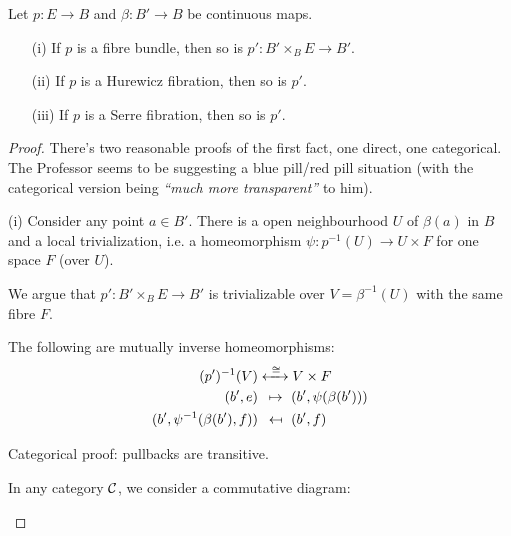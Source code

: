 \begin{theorem}
Let $p:E\to B$ and $\beta:B'\to B$ be continuous maps.
\begin{itemize}
    \item[(i)] If $p$ is a fibre bundle, then so is $p':B'\times_B E\to B'$.
    \item[(ii)] If $p$ is a Hurewicz fibration, then so is $p'$.
    \item[(iii)] If $p$ is a Serre fibration, then so is $p'$.
\end{itemize}
\end{theorem}

\begin{proof}There's two reasonable proofs of the first fact, one direct, one categorical. The Professor seems to be suggesting a blue pill/red pill situation (with the categorical version being \emph{\enquote{much more transparent}} to him).

(i) Consider any point $a\in B'$. There is a open neighbourhood $U$ of $\beta(a)$ in $B$ and a local trivialization, i.e. a homeomorphism $\psi:p^{-1}(U)\to U\times F$ for one space $F$ (over $U$).

We argue that $p':B'\times_B E\to B'$ is trivializable over $V=\beta^{-1}(U)$ with the same fibre $F$.

The following are mutually inverse homeomorphisms:
\begin{align*}
    (p')^{-1}(V)&\xleftrightarrow{\ \cong\ }V\times F\\
    (b',e)&\ \,\mapsto\ (b',\psi(\beta(b')))\\
    (b',\psi^{-1}(\beta(b'),f))&\ \,\mapsfrom\ (b',f)
\end{align*}

Categorical proof: pullbacks are transitive.

In any category $\mathcal{C}$, we consider a commutative diagram:
\begin{center}
\end{center}


\end{proof}
